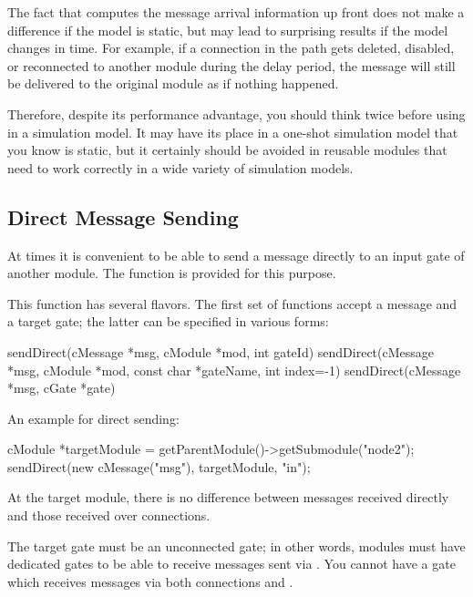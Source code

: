 \begin{note}
  The fact that  computes the message arrival
  information up front does not make a difference if the model is static,
  but may lead to surprising results if the model changes in time.
  For example, if a connection in the path gets deleted, disabled, or
  reconnected to another module during the delay period, the message
  will still be delivered to the original module as if nothing happened.

  Therefore, despite its performance advantage, you should think twice
  before using  in a simulation model. It may have
  its place in a one-shot simulation model that you know is static,
  but it certainly should be avoided in reusable modules that need to
  work correctly in a wide variety of simulation models.
\end{note}


\subsection{Direct Message Sending}
\label{sec:simple-modules:direct-sending}

At times it is convenient to be able to send a message directly to an input
gate of another module. The  function is provided for
this purpose.

This function has several flavors. The first set of 
functions accept a message and a target gate; the latter can be specified
in various forms:

\begin{cpp}
sendDirect(cMessage *msg, cModule *mod, int gateId)
sendDirect(cMessage *msg, cModule *mod, const char *gateName, int index=-1)
sendDirect(cMessage *msg, cGate *gate)
\end{cpp}

An example for direct sending:

\begin{cpp}
cModule *targetModule = getParentModule()->getSubmodule("node2");
sendDirect(new cMessage("msg"), targetModule, "in");
\end{cpp}

At the target module, there is no difference between messages received
directly and those received over connections.

The target gate must be an unconnected gate; in other words,
modules must have dedicated gates to be able to receive messages
sent via . You cannot have a gate which receives
messages via both connections and .

